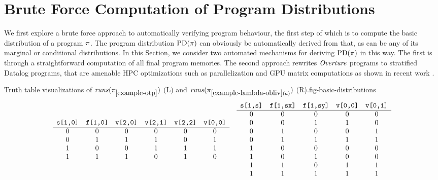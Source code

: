 \section{Brute Force Computation of Program Distributions}
\label{section-bruteforce}

We first explore a brute force approach to automatically verifying
program behaviour, the first step of which is to compute the basic
distribution of a program $\pi$. The program distribution
$\mathrm{PD}(\pi)$ can obviously be automatically derived from that, as
can be any of its marginal or conditional distributions. In this
Section, we consider two automated mechanisms for deriving
$\mathrm{PD}(\pi)$ in this way. The first is through a straightforward
computation of all final program memories.  The second approach
rewrites $\mathit{Overture}$ programs to stratified Datalog programs, that are
amenable HPC optimizations such as parallelization and GPU matrix
computations as shown in recent work
\cite{sakama2017linear,aspis2018linear,nguyen2022enhancing,nguyen2021efficient}.

\begin{fpfig}[t]{Truth table visualizations of $\mathit{runs}(\pi_{\ref{example-otp}})$ (L) and
    $\mathit{runs}(\pi_{\ref{example-lambda-obliv}(a)})$ (R).}{fig-basic-distributions}
{\footnotesize
  $$
  \begin{array}{cc}
    \begin{array}{cccccc}
      \verb+s[1,0]+ & \verb+f[1,0]+ & \verb+v[2,0]+  & \verb+v[2,1]+ & \verb+v[2,2]+ & \verb+v[0,0]+\\
      \hline
      0 & 0 & 0 & 0 & 0 & 0 \\ 
      0 & 1 & 1 & 1 & 0 & 1 \\ 
      1 & 0 & 0 & 1 & 1 & 1 \\ 
      1 & 1 & 1 & 0 & 1 & 0
    \end{array}
    & 
    \begin{array}{ccccc}
      \verb+s[1,s]+ & \verb+f[1,sx]+ & \verb+f[1,sy]+ & \verb+v[0,0]+ & \verb+v[0,1]+ \\
      \hline
      0 & 0 & 0 & 0 & 0 \\ 
      0 & 0 & 1 & 1 & 0 \\ 
      0 & 1 & 0 & 0 & 1 \\ 
      0 & 1 & 1 & 1 & 1 \\
      1 & 0 & 0 & 0 & 0 \\ 
      1 & 0 & 1 & 0 & 0 \\ 
      1 & 1 & 0 & 1 & 1 \\ 
      1 & 1 & 1 & 1 & 1  
    \end{array}
  \end{array}
  $$
}
\end{fpfig}

